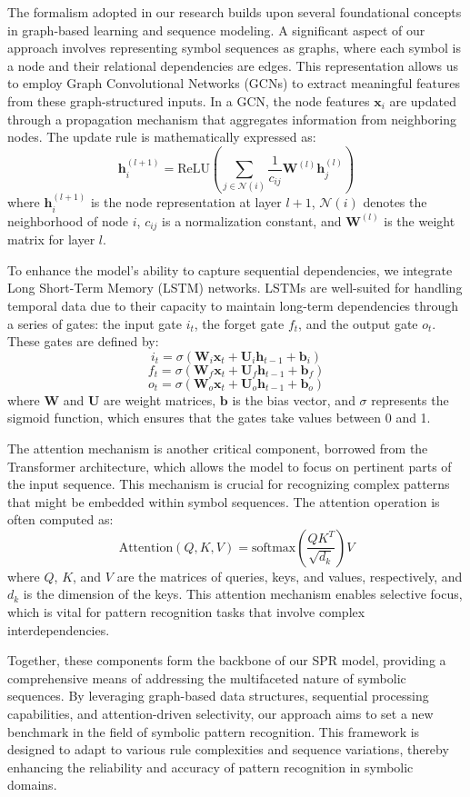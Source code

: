 \documentclass{article}
\begin{document}
The formalism adopted in our research builds upon several foundational concepts in graph-based learning and sequence modeling. A significant aspect of our approach involves representing symbol sequences as graphs, where each symbol is a node and their relational dependencies are edges. This representation allows us to employ Graph Convolutional Networks (GCNs) to extract meaningful features from these graph-structured inputs. In a GCN, the node features $\mathbf{x}_i$ are updated through a propagation mechanism that aggregates information from neighboring nodes. The update rule is mathematically expressed as:
\[
\mathbf{h}_i^{(l+1)} = \text{ReLU}\left(\sum_{j \in \mathcal{N}(i)} \frac{1}{c_{ij}} \mathbf{W}^{(l)} \mathbf{h}_j^{(l)}\right)
\]
where $\mathbf{h}_i^{(l+1)}$ is the node representation at layer $l+1$, $\mathcal{N}(i)$ denotes the neighborhood of node $i$, $c_{ij}$ is a normalization constant, and $\mathbf{W}^{(l)}$ is the weight matrix for layer $l$.

To enhance the model's ability to capture sequential dependencies, we integrate Long Short-Term Memory (LSTM) networks. LSTMs are well-suited for handling temporal data due to their capacity to maintain long-term dependencies through a series of gates: the input gate $i_t$, the forget gate $f_t$, and the output gate $o_t$. These gates are defined by:
\[
i_t = \sigma(\mathbf{W}_i \mathbf{x}_t + \mathbf{U}_i \mathbf{h}_{t-1} + \mathbf{b}_i)
\]
\[
f_t = \sigma(\mathbf{W}_f \mathbf{x}_t + \mathbf{U}_f \mathbf{h}_{t-1} + \mathbf{b}_f)
\]
\[
o_t = \sigma(\mathbf{W}_o \mathbf{x}_t + \mathbf{U}_o \mathbf{h}_{t-1} + \mathbf{b}_o)
\]
where $\mathbf{W}$ and $\mathbf{U}$ are weight matrices, $\mathbf{b}$ is the bias vector, and $\sigma$ represents the sigmoid function, which ensures that the gates take values between 0 and 1.

The attention mechanism is another critical component, borrowed from the Transformer architecture, which allows the model to focus on pertinent parts of the input sequence. This mechanism is crucial for recognizing complex patterns that might be embedded within symbol sequences. The attention operation is often computed as:
\[
\text{Attention}(Q, K, V) = \text{softmax}\left(\frac{QK^T}{\sqrt{d_k}}\right)V
\]
where $Q$, $K$, and $V$ are the matrices of queries, keys, and values, respectively, and $d_k$ is the dimension of the keys. This attention mechanism enables selective focus, which is vital for pattern recognition tasks that involve complex interdependencies.

Together, these components form the backbone of our SPR model, providing a comprehensive means of addressing the multifaceted nature of symbolic sequences. By leveraging graph-based data structures, sequential processing capabilities, and attention-driven selectivity, our approach aims to set a new benchmark in the field of symbolic pattern recognition. This framework is designed to adapt to various rule complexities and sequence variations, thereby enhancing the reliability and accuracy of pattern recognition in symbolic domains.
\end{document}
